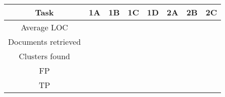 \begin{table}[ht]
\begin{tabular}{|c|c|c|c|c|c|c|c|}
\hline
Task                & 1A & 1B & 1C & 1D & 2A & 2B & 2C \\ \hline
Average LOC         &    &    &    &    &    &    &    \\ \hline
Documents retrieved &    &    &    &    &    &    &    \\ \hline
Clusters found      &    &    &    &    &    &    &    \\ \hline
FP                  &    &    &    &    &    &    &    \\ \hline
TP                  &    &    &    &    &    &    &    \\ \hline
\end{tabular}
\end{table}

